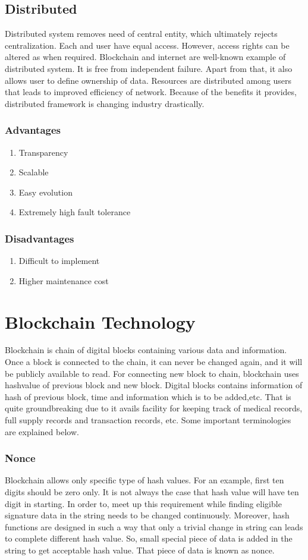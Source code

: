 \documentclass[a4paper,twoside,12pt]{report}
\begin{document}
\begin{spacing}{1.5}
\subsection{Distributed}
Distributed system removes need of central entity, which ultimately rejects centralization. Each and user have equal access. However, access rights can be altered as when required. Blockchain and internet are well-known example of distributed system. It is free from independent failure. Apart from that, it also allows user to define ownership of data. Resources are distributed among users that leads to improved efficiency of network. Because of the benefits it provides, distributed framework is changing industry drastically.
\subsubsection{Advantages}
\begin{enumerate}
	\item{Transparency}
	\item{Scalable}
	\item{Easy evolution}
	\item{Extremely high fault tolerance}
\end{enumerate}
\subsubsection{Disadvantages}
\begin{enumerate}
	\item{Difficult to implement}
	\item{Higher maintenance cost}
\end{enumerate} 
\section{Blockchain Technology}
Blockchain is chain of digital blocks containing various data and information. Once a block is connected to the chain, it can never be changed again, and it will be publicly available to read. For connecting new block to chain, blockchain uses hashvalue of previous block and new block. Digital blocks contains information of hash of previous block, time and information which is to be added,etc. That is quite groundbreaking due to it avails facility for keeping track of medical records, full supply records and transaction records, etc. Some important terminologies are explained below.
\subsubsection{Nonce}
Blockchain allows only specific type of hash values. For an example, first ten digits should be zero only. It is not always the case that hash value will have ten digit in starting. In order to, meet up this requirement while finding eligible signature data in the string needs to be changed continuously. Moreover, hash functions are designed in such a way that only a trivial change in string can leads to complete different hash value. So, small special piece of data is added in the string to get acceptable hash value. That piece of data is known as nonce.   

\end{spacing}
\end{document}
